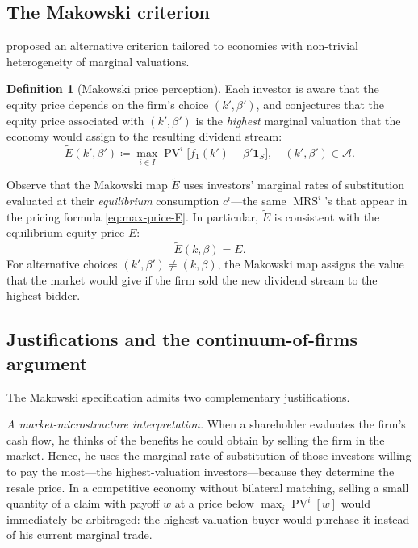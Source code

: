 \documentclass[11pt,a4paper,oneside]{book}
\def\1{\mathbf{1}}
\DeclareMathOperator{\MRS}{MRS}
\DeclareMathOperator{\PV}{PV}
\theoremstyle{plain}
\theoremstyle{definition}
\newtheorem{definition}[theorem]{Definition}
\theoremstyle{remark}
\numberwithin{equation}{chapter}
\begin{document}
\subsection{The Makowski criterion}

\citet{Makowski1983b} proposed an alternative criterion tailored to economies with non-trivial heterogeneity of marginal valuations.

\begin{definition}[Makowski price perception]\label{def:makowski}
Each investor is aware that the equity price depends on the firm's choice $(k', \beta')$, and conjectures that the equity price associated with $(k', \beta')$ is the \emph{highest} marginal valuation that the economy would assign to the resulting dividend stream:
\begin{equation}\label{eq:makowski}
  \widetilde{E}(k', \beta') \coloneqq \max_{i \in I} \PV^i\bigl[ f_1(k') - \beta' \1_S \bigr],
  \quad (k', \beta') \in \mathcal{A}.
\end{equation}
\end{definition}

Observe that the Makowski map $\widetilde{E}$ uses investors' marginal rates of substitution evaluated at their \emph{equilibrium} consumption $c^i$---the same $\MRS^i$'s that appear in the pricing formula \eqref{eq:max-price-E}.
In particular, $\widetilde{E}$ is consistent with the equilibrium equity price $E$:
\begin{equation*}
  \widetilde{E}(k, \beta) = E.
\end{equation*}
For alternative choices $(k', \beta') \neq (k, \beta)$, the Makowski map assigns the value that the market would give if the firm sold the new dividend stream to the highest bidder.

\subsection{Justifications and the continuum-of-firms argument}
\label{sec:makowski-justification}

The Makowski specification admits two complementary justifications.

\emph{A market-microstructure interpretation.}
When a shareholder evaluates the firm's cash flow, he thinks of the benefits he could obtain by selling the firm in the market.
Hence, he uses the marginal rate of substitution of those investors willing to pay the most---the highest-valuation investors---because they determine the resale price.
In a competitive economy without bilateral matching, selling a small quantity of a claim with payoff $w$ at a price below $\max_i \PV^i[w]$ would immediately be arbitraged: the highest-valuation buyer would purchase it instead of his current marginal trade.
\end{document}
